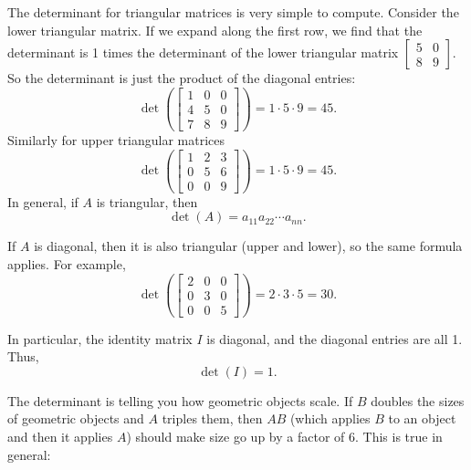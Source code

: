 The determinant for triangular matrices is very simple to compute.
Consider the lower triangular matrix.  If we expand along the
first row, we find that the determinant is 1 times the determinant
of the lower triangular matrix $\left[ \begin{smallmatrix} 5 & 0 \\ 8 & 9
\end{smallmatrix} \right]$.  So the determinant is just the
product of the diagonal entries:
\begin{equation*}
\det \left(
\begin{bmatrix}
1 & 0 & 0 \\
4 & 5 & 0 \\
7 & 8 & 9
\end{bmatrix}
\right)
=
1 \cdot 5 \cdot 9 = 45 .
\end{equation*}
Similarly for upper triangular matrices
\begin{equation*}
\det \left(
\begin{bmatrix}
1 & 2 & 3 \\
0 & 5 & 6 \\
0 & 0 & 9
\end{bmatrix}
\right)
=
1 \cdot 5 \cdot 9 = 45 .
\end{equation*}
In general, if $A$ is triangular, then
\begin{equation*}
\det (A) = a_{11} a_{22} \cdots a_{nn} .
\end{equation*}

If $A$ is diagonal, then it is also triangular (upper and lower), so
the same formula applies.  For example,
\begin{equation*}
\det \left(
\begin{bmatrix}
2 & 0 & 0 \\
0 & 3 & 0 \\
0 & 0 & 5
\end{bmatrix}
\right)
=
2 \cdot 3 \cdot 5 = 30 .
\end{equation*}

In particular, the identity matrix $I$ is diagonal, and the diagonal entries
are all 1.  Thus,
\begin{equation*}
\det(I) = 1 .
\end{equation*}

\medskip

The determinant is telling you how geometric objects scale.
If $B$ doubles the sizes of geometric objects and $A$ triples them,
then $AB$ (which applies $B$ to an object and then it applies $A$) should make size
go up by a factor of $6$.  This is true in general:


